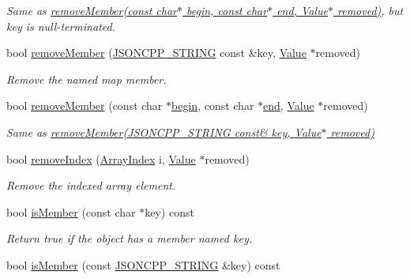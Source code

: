\begin{DoxyCompactItemize}
\begin{DoxyCompactList}\small\item\em Same as \hyperlink{classJson_1_1Value_a49c91af727d6b4eb0af02a81bb2def87}{remove\+Member(const char$\ast$ begin, const char$\ast$ end, Value$\ast$ removed)}, but \textquotesingle{}key\textquotesingle{} is null-\/terminated. \end{DoxyCompactList}\item 
bool \hyperlink{classJson_1_1Value_ae385ecef98427970df525ee876e9f54a}{remove\+Member} (\hyperlink{json_8hpp_a1e723f95759de062585bc4a8fd3fa4be}{J\+S\+O\+N\+C\+P\+P\+\_\+\+S\+T\+R\+I\+NG} const \&key, \hyperlink{classJson_1_1Value}{Value} $\ast$removed)
\begin{DoxyCompactList}\small\item\em Remove the named map member. \end{DoxyCompactList}\item 
bool \hyperlink{classJson_1_1Value_a49c91af727d6b4eb0af02a81bb2def87}{remove\+Member} (const char $\ast$\hyperlink{classJson_1_1Value_ac12df0d6980600c5bac908ed0f64856e}{begin}, const char $\ast$\hyperlink{classJson_1_1Value_a596da1926b2f2a4056bff2edb713eb0b}{end}, \hyperlink{classJson_1_1Value}{Value} $\ast$removed)
\begin{DoxyCompactList}\small\item\em Same as \hyperlink{classJson_1_1Value_ae385ecef98427970df525ee876e9f54a}{remove\+Member(\+J\+S\+O\+N\+C\+P\+P\+\_\+\+S\+T\+R\+I\+N\+G const\& key, Value$\ast$ removed)} \end{DoxyCompactList}\item 
bool \hyperlink{classJson_1_1Value_ae9e67e08a85a2f3be3396ec0f4c47f65}{remove\+Index} (\hyperlink{classJson_1_1Value_a184a91566cccca7b819240f0d5561c7d}{Array\+Index} i, \hyperlink{classJson_1_1Value}{Value} $\ast$removed)
\begin{DoxyCompactList}\small\item\em Remove the indexed array element. \end{DoxyCompactList}\item 
bool \hyperlink{classJson_1_1Value_a196defba501d70ea2b6793afb04108e3}{is\+Member} (const char $\ast$key) const 
\begin{DoxyCompactList}\small\item\em Return true if the object has a member named key. \end{DoxyCompactList}\item 
bool \hyperlink{classJson_1_1Value_ab68c6bcc59930e517495013394c93c83}{is\+Member} (const \hyperlink{json_8hpp_a1e723f95759de062585bc4a8fd3fa4be}{J\+S\+O\+N\+C\+P\+P\+\_\+\+S\+T\+R\+I\+NG} \&key) const 

\end{DoxyCompactItemize}
